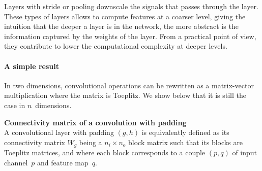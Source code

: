 Layers with stride or pooling downscale the signals that passes through the layer. These types of layers allows to compute features at a coarser level, giving the intuition that the deeper a layer is in the network, the more abstract is the information captured by the weights of the layer. From a practical point of view, they contribute to lower the computational complexity at deeper levels.

\paragraph{A simple result}
In two dimensions, convolutional operations can be rewritten as a matrix-vector multiplication where the matrix is Toeplitz. We show below that it is still the case in $n$~dimensions.

\begin{proposition}\textbf{Connectivity matrix of a convolution with padding}\\
A convolutional layer with padding $(g, h)$ is equivalently defined as its connectivity matrix $W_g$ being a $n_i \times n_o$ block matrix such that its blocks are Toeplitz matrices, and where each block corresponds to a couple $(p,q)$ of input channel~$p$ and feature map~$q$.
\end{proposition}


